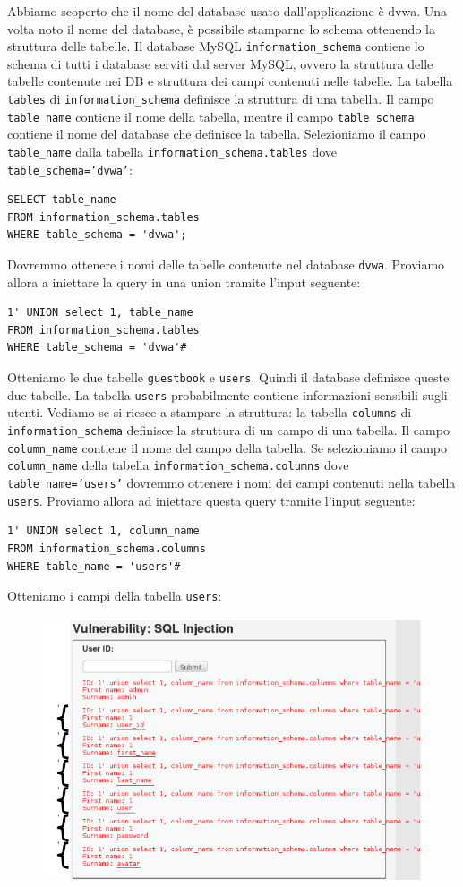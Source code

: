 Abbiamo scoperto che il nome del database usato dall'applicazione è dvwa. Una volta noto il nome del database, è possibile stamparne lo schema ottenendo la struttura delle tabelle. Il database MySQL \texttt{information\_schema} contiene lo schema di tutti i database serviti dal server MySQL, ovvero la struttura delle tabelle contenute nei DB e struttura dei campi contenuti nelle tabelle. La tabella \texttt{tables} di \texttt{information\_schema} definisce la struttura di una tabella. Il campo \texttt{table\_name} contiene il nome della tabella, mentre il campo \texttt{table\_schema} contiene il nome del database che definisce la tabella. Selezioniamo il campo \texttt{table\_name} dalla tabella \texttt{information\_schema.tables} dove \texttt{table\_schema='dvwa'}:
\begin{lstlisting}
SELECT table_name
FROM information_schema.tables
WHERE table_schema = 'dvwa';
\end{lstlisting}
Dovremmo ottenere i nomi delle tabelle contenute nel database \texttt{dvwa}. Proviamo allora a iniettare la query in una union tramite l'input seguente:
\begin{lstlisting}
1' UNION select 1, table_name
FROM information_schema.tables
WHERE table_schema = 'dvwa'#
\end{lstlisting}
Otteniamo le due tabelle \texttt{guestbook} e \texttt{users}. Quindi il database definisce queste due tabelle. La tabella \texttt{users} probabilmente contiene informazioni sensibili sugli utenti. Vediamo se si riesce a stampare la struttura: la tabella \texttt{columns} di \texttt{information\_schema} definisce la struttura di un campo di una tabella. Il campo \texttt{column\_name} contiene il nome del campo della tabella. Se selezioniamo il campo \texttt{column\_name} della tabella \texttt{information\_schema.columns} dove \texttt{table\_name='users'} dovremmo ottenere i nomi dei campi contenuti nella tabella \texttt{users}. Proviamo allora ad iniettare questa query tramite l'input seguente:
\begin{lstlisting}
1' UNION select 1, column_name
FROM information_schema.columns
WHERE table_name = 'users'#
\end{lstlisting}
Otteniamo i campi della tabella \texttt{users}:

\begin{figure}[hbpt!]
    \centering
    \includegraphics[width=0.6 \textwidth]{./Images/cap6/6.4.png}
\end{figure}
\FloatBarrier

